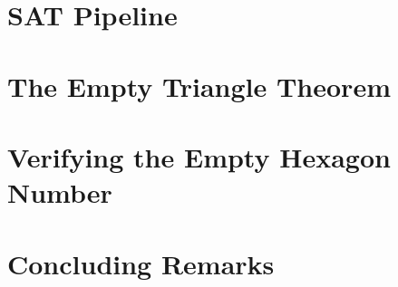 \documentclass{easychair}
\begin{document}
\section{SAT Pipeline}
\label{sec:leansat}


\section{The Empty Triangle Theorem}
\label{sec:empty-triangle}


\section{Verifying the Empty Hexagon Number}
\label{sec:empty-hexagon-number}



\section{Concluding Remarks}
\label{sec:conclusion}


% 
% 
% 

\end{document}
